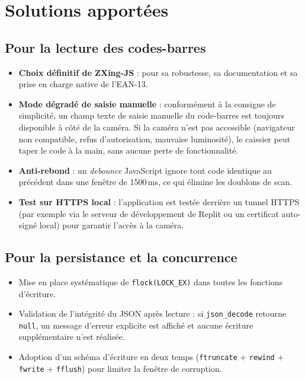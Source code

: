 \documentclass[12pt,a4paper]{article}
\begin{document}
\section{Solutions apportées}

\subsection{Pour la lecture des codes-barres}

\begin{itemize}[leftmargin=1.5em]
    \item \textbf{Choix définitif de ZXing-JS} : pour sa robustesse, sa documentation et sa prise en charge native de l'EAN-13.
    \item \textbf{Mode dégradé de saisie manuelle} : conformément à la consigne de simplicité, un champ texte de saisie manuelle du code-barres est toujours disponible à côté de la caméra. Si la caméra n'est pas accessible (navigateur non compatible, refus d'autorisation, mauvaise luminosité), le caissier peut taper le code à la main, sans aucune perte de fonctionnalité.
    \item \textbf{Anti-rebond} : un \textit{debounce} JavaScript ignore tout code identique au précédent dans une fenêtre de 1500\,ms, ce qui élimine les doublons de scan.
    \item \textbf{Test sur HTTPS local} : l'application est testée derrière un tunnel HTTPS (par exemple via le serveur de développement de Replit ou un certificat auto-signé local) pour garantir l'accès à la caméra.
\end{itemize}

\subsection{Pour la persistance et la concurrence}

\begin{itemize}[leftmargin=1.5em]
    \item Mise en place systématique de \texttt{flock(LOCK\_EX)} dans toutes les fonctions d'écriture.
    \item Validation de l'intégrité du JSON après lecture : si \texttt{json\_decode} retourne \texttt{null}, un message d'erreur explicite est affiché et aucune écriture supplémentaire n'est réalisée.
    \item Adoption d'un schéma d'écriture en deux temps (\texttt{ftruncate} + \texttt{rewind} + \texttt{fwrite} + \texttt{fflush}) pour limiter la fenêtre de corruption.
\end{itemize}
\end{document}
